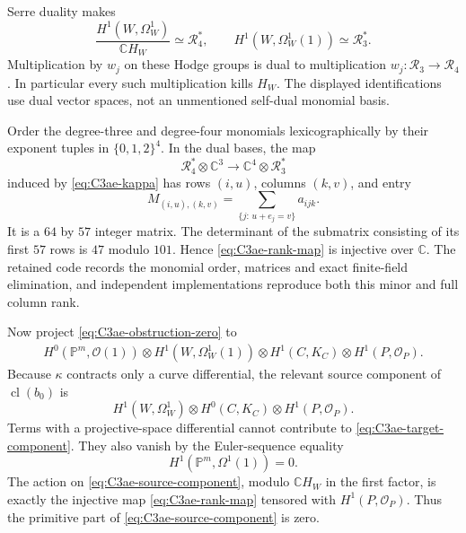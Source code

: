 Serre duality makes
\[
 \frac{H^1(W,\Omega^1_W)}{\mathbb C H_W}
      \simeq\mathcal R_4^*,
 \qquad H^1(W,\Omega^1_W(1))\simeq\mathcal R_3^*.
\]
Multiplication by $w_j$ on these Hodge groups is dual
to multiplication $w_j:\mathcal R_3\to\mathcal R_4$.
In particular every such multiplication kills $H_W$.
The displayed identifications use dual vector spaces,
not an unmentioned self-dual monomial basis.

Order the degree-three and degree-four monomials
lexicographically by their exponent tuples in
$\{0,1,2\}^4$. In the dual bases, the map
\begin{equation}\label{eq:C3ae-rank-map}
 \mathcal R_4^*\otimes\mathbb C^3
       \longrightarrow\mathbb C^4\otimes\mathcal R_3^*
\end{equation}
induced by \eqref{eq:C3ae-kappa} has rows $(i,u)$,
columns $(k,v)$, and entry
\[
                  M_{(i,u),(k,v)}
                     =\sum_{\{j:\,u+e_j=v\}} a_{ijk}.
\]
It is a $64$ by $57$ integer matrix. The determinant of
the submatrix consisting of its first $57$ rows is
$47$ modulo $101$. Hence \eqref{eq:C3ae-rank-map} is
injective over $\mathbb C$. The retained code records
the monomial order, matrices and exact finite-field
elimination, and independent implementations reproduce
both this minor and full column rank.

Now project \eqref{eq:C3ae-obstruction-zero} to
\begin{equation}\label{eq:C3ae-target-component}
 \begin{split}
 H^0(\mathbb P^m,\mathcal O(1))
  \otimes H^1(W,\Omega^1_W(1))
  \otimes H^1(C,K_C)
  \otimes H^1(P,\mathcal O_P).
 \end{split}
\end{equation}
Because $\kappa$ contracts only a curve differential,
the relevant source component of $\operatorname{cl}(b_0)$ is
\begin{equation}\label{eq:C3ae-source-component}
 H^1(W,\Omega^1_W)\otimes H^0(C,K_C)
                          \otimes H^1(P,\mathcal O_P).
\end{equation}
Terms with a projective-space differential cannot
contribute to \eqref{eq:C3ae-target-component}. They
also vanish by the Euler-sequence equality
\[
                       H^1(\mathbb P^m,\Omega^1(1))=0.
\]
The action on
\eqref{eq:C3ae-source-component}, modulo $\mathbb C H_W$
in the first factor, is exactly the injective map
\eqref{eq:C3ae-rank-map} tensored with
$H^1(P,\mathcal O_P)$. Thus the primitive part of
\eqref{eq:C3ae-source-component} is zero.

